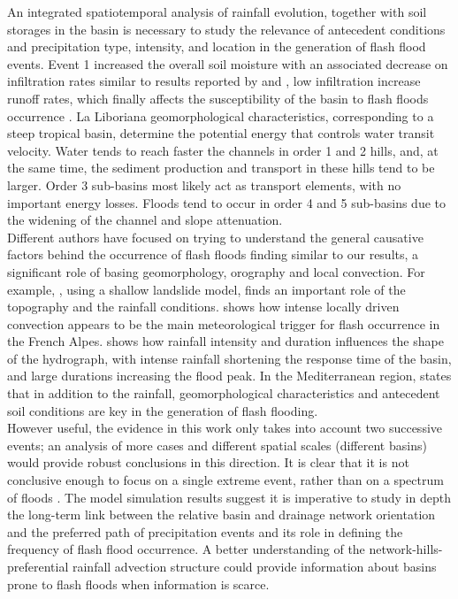 \documentclass[hess, manuscript]{copernicus}
\begin{document}
An integrated spatiotemporal analysis of rainfall evolution, together with soil storages in the basin is necessary to study the relevance of antecedent conditions and precipitation type, intensity, and location in the generation of flash flood events.  Event 1 increased the overall soil moisture with an associated decrease on infiltration rates similar to results reported by \citet{Penna2011} and \citet{Zehe2010}, low infiltration increase runoff rates, which finally affects the susceptibility of the basin to  flash floods occurrence \citep{Wagner1999,Penna2011,Tramblay2012b}. La Liboriana geomorphological characteristics, corresponding to a steep tropical basin, determine the potential energy that controls water transit velocity.  Water tends to reach faster the channels in order 1 and 2 hills, and, at the same time, the sediment production and transport in these hills tend to be larger.  Order 3 sub-basins most likely act as transport elements, with no important energy losses. Floods tend to occur in order 4 and 5 sub-basins due to the widening of the channel and slope attenuation. \\

Different authors have focused on trying to understand the general causative factors behind the occurrence of flash floods finding similar to our results, a significant role of basing geomorphology, orography and local convection. For example, \citet{Lehmann2012}, using a shallow landslide model, finds an important role of the topography and the rainfall conditions.  \citet{Turkington2014} shows how intense locally driven convection appears to be the main meteorological trigger for flash occurrence in the French Alpes.\citet{Camarasa2016} shows how rainfall intensity and duration influences the shape of the hydrograph, with intense rainfall shortening the response time of the basin, and large durations increasing the flood peak. In the Mediterranean region, \citet{Boudou2016}  states that in addition to the rainfall, geomorphological characteristics and antecedent soil conditions are key in the generation of flash flooding.\\

However useful, the evidence in this work only takes into account two successive events; an analysis of more cases and different spatial scales (different basins) would provide robust conclusions in this direction. It is clear that it is not conclusive enough to focus on a single extreme event, rather than on a spectrum of floods \cite{Merz2003}.  The model simulation results suggest it is imperative to study in depth the long-term link between the relative basin and drainage network orientation and the preferred path of precipitation events and its role in defining the frequency of flash flood occurrence. A better understanding of the network-hills-preferential rainfall advection structure could provide information about basins prone to flash floods when information is scarce.\\
\end{document}
